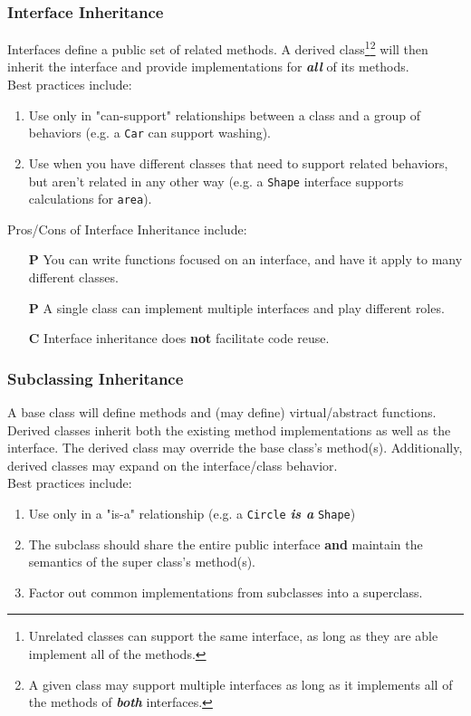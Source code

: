 \documentclass{article}
\begin{document}
\subsubsection{Interface Inheritance}
Interfaces define a public set of related methods. A derived
class\footnote{Unrelated classes can support the same interface, as
  long as they are able implement all of the methods.}\footnote{A
  given class may support multiple interfaces as long as it implements
  all of the methods of \textit{\textbf{both}} interfaces.} will then
inherit the interface and provide implementations for
\textit{\textbf{all}} of its methods. \\ 
Best practices include:
\begin{enumerate}[label=(\roman*)]
\item Use only in "can-support" relationships between a class and a
  group of behaviors (e.g. a \texttt{Car} can support washing).
\item Use when you have different classes that need to support related
  behaviors, but aren't related in any other way
  (e.g. a \texttt{Shape} interface supports calculations for
  \texttt{area}).
\end{enumerate}
\newpage
Pros/Cons of Interface Inheritance include:
\begin{enumerate}
\item [\textbf{P}] You can write functions focused on an interface, and have it
  apply to many different classes.
\item [\textbf{P}] A single class can implement multiple interfaces and play
  different roles.
\item [\textbf{C}] Interface inheritance does \textbf{not} facilitate code reuse.
\end{enumerate}

\subsubsection{Subclassing Inheritance}
A base class will define methods and (may define) virtual/abstract
functions. Derived classes inherit both the existing method
implementations as well as the interface. The derived class may
override the base class's method(s). Additionally, derived classes may
expand on the interface/class behavior. \\
Best practices include:
\begin{enumerate}[label=(\roman*)]
\item Use only in a "is-a" relationship (e.g. a \texttt{Circle}
  \textit{\textbf{is a}} \texttt{Shape})
\item The subclass should share the entire public interface
  \textbf{and} maintain the semantics of the super class's method(s).
\item Factor out common implementations from subclasses into a superclass.
\end{enumerate}
\end{document}
